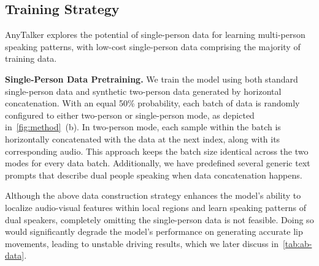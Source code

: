 \subsection{Training Strategy}
\label{subsec:training-strategy}
AnyTalker explores the potential of single-person data for learning multi-person speaking patterns, with low-cost single-person data comprising the majority of training data.

\noindent \textbf{Single-Person Data Pretraining.}
We train the model using both standard single-person data and synthetic two-person data generated by horizontal concatenation. 
With an equal 50\% probability, each batch of data is randomly configured to either two-person or single-person mode, as depicted in~\cref{fig:method}~(b).
In two-person mode, each sample within the batch is horizontally concatenated with the data at the next index, along with its corresponding audio. 
This approach keeps the batch size identical across the two modes for every data batch.
Additionally, we have predefined several generic text prompts that describe dual people speaking when data concatenation happens.

Although the above data construction strategy enhances the model's ability to localize audio-visual features within local regions and learn speaking patterns of dual speakers, completely omitting the single-person data is not feasible. 
Doing so would significantly degrade the model's performance on generating accurate lip movements, leading to unstable driving results, which we later discuss in~\cref{tab:ab-data}.


